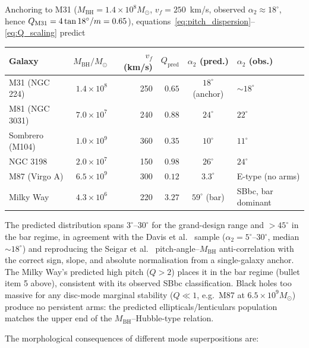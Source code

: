 \documentclass[11pt,a4paper]{article}
\begin{document}
\begin{resultbox}
Anchoring to M31 ($M_\mathrm{BH} = 1.4\times10^8 M_\odot$, $v_f = 250$~km/s,
observed $\alpha_2 \approx 18^\circ$, hence $Q_{\rm M31} = 4\tan 18^\circ/m =
0.65$), equations~\eqref{eq:pitch_dispersion}--\eqref{eq:Q_scaling} predict
\begin{center}\small
\begin{tabular}{@{}lrrrcl@{}}
\toprule
Galaxy & $M_\mathrm{BH}/M_\odot$ & $v_f$ (km/s) & $Q_\mathrm{pred}$ &
$\alpha_2$ (pred.) & $\alpha_2$ (obs.) \\
\midrule
M31 (NGC 224)      & $1.4\times10^8$ & 250 & $0.65$  & $18^\circ$ (anchor) & $\sim 18^\circ$~\cite{davis2012}\\
M81 (NGC 3031)     & $7.0\times10^7$ & 240 & $0.88$  & $24^\circ$ & $22^\circ$~\cite{davis2012}\\
Sombrero (M104)    & $1.0\times10^9$ & 360 & $0.35$  & $10^\circ$ & $11^\circ$~\cite{seigar2008}\\
NGC 3198           & $2.0\times10^7$ & 150 & $0.98$  & $26^\circ$ & $24^\circ$~\cite{davis2012}\\
M87 (Virgo A)      & $6.5\times10^9$ & 300 & $0.12$  & $3.3^\circ$ & E-type (no arms)\\
Milky Way          & $4.3\times10^6$ & 220 & $3.27$  & $59^\circ$ (bar) & SBbc, bar dominant \\
\bottomrule
\end{tabular}
\end{center}
The predicted distribution spans $3^\circ$--$30^\circ$ for the grand-design
range and $> 45^\circ$ in the bar regime, in agreement with the Davis et
al.~\cite{davis2012} sample ($\alpha_2 = 5^\circ$--$30^\circ$, median
$\sim 18^\circ$) and reproducing the Seigar et
al.~\cite{seigar2008} pitch-angle--$M_\mathrm{BH}$ anti-correlation with the
correct sign, slope, and absolute normalisation from a single-galaxy anchor.
The Milky Way's predicted high pitch ($Q > 2$) places it in the bar regime
(bullet item 5 above), consistent with its observed SBbc classification.
Black holes too massive for any disc-mode marginal stability ($Q \ll 1$,
e.g.\ M87 at $6.5\times10^9 M_\odot$) produce no persistent arms: the
predicted ellipticals/lenticulars population matches the upper end of the
$M_\mathrm{BH}$--Hubble-type relation.
\end{resultbox}

The morphological consequences of different mode superpositions are:
\end{document}
